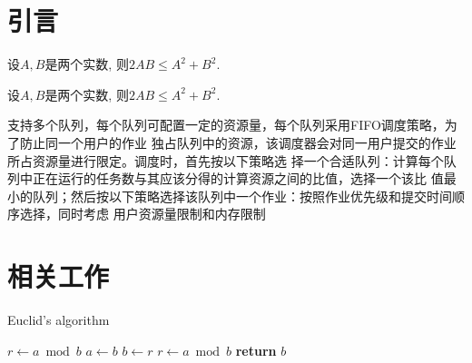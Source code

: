 \documentclass[onecolumn,a4paper,10pt,adobefonts]{ctexart}
\begin{document}
\section{引言}

\begin{theorem}[均值不等式]
设$A,B$是两个实数, 则$2AB\leq A^2+B^2$.
\end{theorem}

\begin{definition}[均值不等式]
设$A,B$是两个实数, 则$2AB\leq A^2+B^2$.
\end{definition}

支持多个队列，每个队列可配置一定的资源量，每个队列采用FIFO调度策略，为了防止同一个用户的作业
独占队列中的资源，该调度器会对同一用户提交的作业\cite{knuth}所占资源量进行限定。调度时，首先按以下策略选
择一个合适队列：计算每个队列中正在运行的任务数与其应该分得的计算资源之间的比值，选择一个该比
值最小的队列；然后按以下策略选择该队列中一个作业：按照作业优先级\cite{lamport}和提交时间顺序选择，同时考虑
用户资源量限制和内存限制

\section{相关工作}

\begin{algorithm}
\caption{Euclid’s algorithm}\label{euclid}
\begin{algorithmic}[1]
   \State $r\gets a\bmod b$
      \State $a\gets b$
      \State $b\gets r$
      \State $r\gets a\bmod b$
   \EndWhile\label{euclidendwhile}
   \State \textbf{return} $b$
\EndProcedure
\end{algorithmic}
\end{algorithm}

\appendix
\small
\setlength{\itemsep}{0pt}
\setlength{\parskip}{0pt}  %


\end{document}
